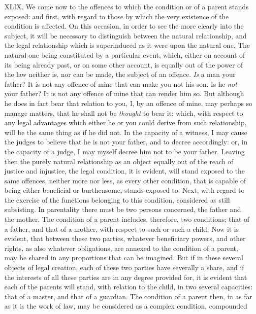 \documentclass[12pt]{report}
\begin{document}
XLIX. We come now to the offences to which the condition or of a parent
stands exposed: and first, with regard to those by which the very
existence of the condition is affected. On this occasion, in order to
see the more clearly into the subject, it will be necessary to
distinguish between the natural relationship, and the legal relationship
which is superinduced as it were upon the natural one. The natural one
being constituted by a particular event, which, either on account of its
being already past, or on some other account, is equally out of the
power of the law neither is, nor can be made, the subject of an offence.
\emph{Is} a man your father? It is not any offence of mine that can make
you not his son. Is he \emph{not} your father? It is not any offence of
mine that can render him so. But although he does in fact bear that
relation to you, I, by an offence of mine, may perhaps so manage
matters, that he shall not be \emph{thought} to bear it: which, with
respect to any legal advantages which either he or you could derive from
such relationship, will be the same thing as if he did not. In the
capacity of a witness, I may cause the judges to believe that he is not
your father, and to decree accordingly: or, in the capacity of a judge,
I may myself decree him not to be your father. Leaving then the purely
natural relationship as an object equally out of the reach of justice
and injustice, the legal condition, it is evident, will stand exposed to
the same offences, neither more nor less, as every other condition, that
is capable of being either beneficial or burthensome, stands exposed to.
Next, with regard to the exercise of the functions belonging to this
condition, considered as still subsisting. In parentality there must be
two persons concerned, the father and the mother. The condition of a
parent includes, therefore, two conditions; that of a father, and that
of a mother, with respect to such or such a child. Now it is evident,
that between these two parties, whatever beneficiary powers, and other
rights, as also whatever obligations, are annexed to the condition of a
parent, may be shared in any proportions that can be imagined. But if in
these several objects of legal creation, each of these two parties have
severally a share, and if the interests of all these parties are in any
degree provided for, it is evident that each of the parents will stand,
with relation to the child, in two several capacities: that of a master,
and that of a guardian. The condition of a parent then, in as far as it
is the work of law, may be considered as a complex condition, compounded
\end{document}
